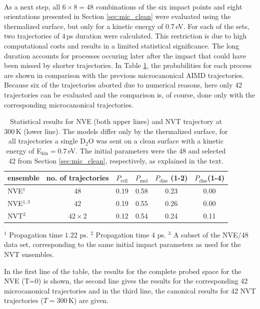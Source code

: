 \documentclass[11pt,DIV=13,BCOR=5mm,a4paper,headinclude]{scrbook}
\begin{document}
\\
As a next step, all $6\times 8=48$ combinations of the six impact points and eight orientations presented in Section \ref{sec:mic_clean} were evaluated using the thermalized surface, but only for a kinetic energy of $0.7\,$eV.
For each of the sets, two trajectories of $4\,$ps duration were calculated.
This restriction is due to high computational costs and results in a limited statistical significance.
The long duration accounts for processes occuring later after the impact that could have been missed by shorter trajectories.
In Table \ref{tab:nvt-nve_comp}, the probabilities for each process are shown in comparison with the previous microcanonical AIMD trajectories.
Because six of the trajectories aborted due to numerical reasons, here only 42 trajectories can be evaluated and the comparison is, of course, done only with the corresponding microcanonical trajectories.
\begin{table}[!h]
 \centering
 \caption{Statistical results for NVE (both upper lines) and NVT trajectory at $300\,$K (lower line).
The models differ only by the thermalized surface, for all trajectories a single D$_2$O was sent on a clean surface with a kinetic energy of E$_\textrm{kin}=0.7\,$eV.
The initial parameters were the 48 and selected 42 from Section \ref{sec:mic_clean}, respectively, as explained in the text.}
\vspace*{.2cm}
  \begin{tabular}{lc|cccc}
 \toprule
  ensemble & no.
of trajectories & $P_\textrm{refl}$ & $P_\textrm{mol}$ & $P_\textrm{diss}$ (1-2) & $P_\textrm{diss}$(1-4) 
 \\\midrule
 NVE$^1$         & 48 & 0.19 & 0.58 & 0.23 & 0.00 \\
 NVE$^{1,3}$     & 42 & 0.19 & 0.55 & 0.26 & 0.00 \\
 NVT$^2$ &$42\times 2$& 0.12 & 0.54 & 0.24 & 0.11 \\\bottomrule
  \end{tabular}
\begin{tablenotes}
 \footnotesize
\item[] $^1$ Propagation time $1.22$ ps.
$^2$ Propagation time 4 ps.
$^3$ A subset of the NVE/48 data set,  corresponding to the same initial impact parameters as used for the NVT ensembles.
\end{tablenotes}
\label{tab:nvt-nve_comp}
\end{table}
In the first line of the table, the results for the complete probed space for the NVE (T=0) is shown, the second line gives the results for the corresponding 42 microcanonical trajectories and in the third line, the canonical results for 42 NVT trajectories ($T=300\,$K) are given.
\end{document}

